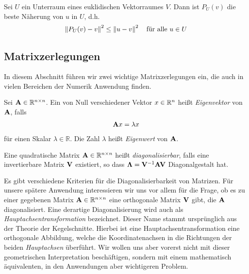\begin{thm}
Sei $U$ ein Unterraum eines euklidischen Vektorraumes $V$. Dann ist $P_U(v)$ die beste Näherung von $u$ in $U$, d.h.
$$\left\lVert P_U(v) - v \right\rVert^2 \leq \left\lVert u - v \right\rVert^2 \quad \text{für alle } u \in U$$
\end{thm}

\subsection{Matrixzerlegungen}
\label{matrix_decomposition}

In diesem Abschnitt führen wir zwei wichtige Matrixzerlegungen ein, die auch in vielen Bereichen der Numerik Anwendung finden.

\begin{defn}
Sei $\mathbf{A} \in \mathbb{R}^{n \times n}$. Ein von Null verschiedener Vektor $x \in \mathbb{R}^n$ heißt \textit{Eigenvektor} von $\mathbf{A}$, falls
$$\mathbf{A}x = \lambda x$$
für einen Skalar $\lambda \in \mathbb{R}$. Die Zahl $\lambda$ heißt \textit{Eigenwert} von $\mathbf{A}$.
\end{defn}

\begin{defn}
Eine quadratische Matrix $\mathbf{A} \in \mathbb{R}^{n \times n}$ heißt \textit{diagonalisierbar}, falls eine invertierbare Matrix $\mathbf{V}$ existiert, so dass $\mathbf{\Lambda} = \mathbf{V}^{-1}\mathbf{A}\mathbf{V}$ Diagonalgestalt hat.
\end{defn}

Es gibt verschiedene Kriterien für die Diagonalisierbarkeit von Matrizen. Für unsere spätere Anwendung interessieren wir uns vor allem für die Frage, ob es zu einer gegebenen Matrix $\mathbf{A} \in \mathbb{R}^{n \times n}$ eine orthogonale Matrix $\mathbf{V}$ gibt, die $\mathbf{A}$ diagonalisiert. Eine derartige Diagonalisierung wird auch als \textit{Hauptachsentransformation} bezeichnet. Dieser Name stammt ursprünglich aus der Theorie der Kegelschnitte. Hierbei ist eine Hauptachsentransformation eine orthogonale Abbildung, welche die Koordinatenachsen in die Richtungen der beiden \textit{Hauptachsen} überführt. Wir wollen uns aber vorerst nicht mit dieser geometrischen Interpretation beschäftigen, sondern mit einem mathematisch äquivalenten, in den Anwendungen aber wichtigeren Problem.


